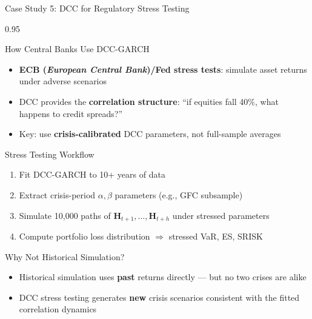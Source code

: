 \documentclass[9pt, aspectratio=169, t]{beamer}
\begin{document}
\begin{frame}{Case Study 5: DCC for Regulatory Stress Testing}
    \begin{cminipage}{0.95\textwidth}
    {\footnotesize
    \begin{block}{How Central Banks Use DCC-GARCH}
        \begin{itemize}\setlength{\itemsep}{0pt}
            \item \textbf{ECB (\textit{European Central Bank})/Fed stress tests}: simulate asset returns under adverse scenarios
            \item DCC provides the \textbf{correlation structure}: ``if equities fall 40\%, what happens to credit spreads?''
            \item Key: use \textbf{crisis-calibrated} DCC parameters, not full-sample averages
        \end{itemize}
    \end{block}
    \vspace{-2mm}
    \begin{block}{Stress Testing Workflow}
        \begin{enumerate}\setlength{\itemsep}{0pt}
            \item Fit DCC-GARCH to 10+ years of data
            \item Extract crisis-period $\alpha, \beta$ parameters (e.g., GFC subsample)
            \item Simulate 10,000 paths of $\mathbf{H}_{t+1}, \ldots, \mathbf{H}_{t+h}$ under stressed parameters
            \item Compute portfolio loss distribution $\Rightarrow$ stressed VaR, ES, SRISK
        \end{enumerate}
    \end{block}
    \vspace{-2mm}
    \begin{alertblock}{Why Not Historical Simulation?}
        \begin{itemize}\setlength{\itemsep}{0pt}
            \item Historical simulation uses \textbf{past} returns directly --- but no two crises are alike
            \item DCC stress testing generates \textbf{new} crisis scenarios consistent with the fitted correlation dynamics
        \end{itemize}
    \end{alertblock}
    }
    \end{cminipage}
\end{frame}
\end{document}
